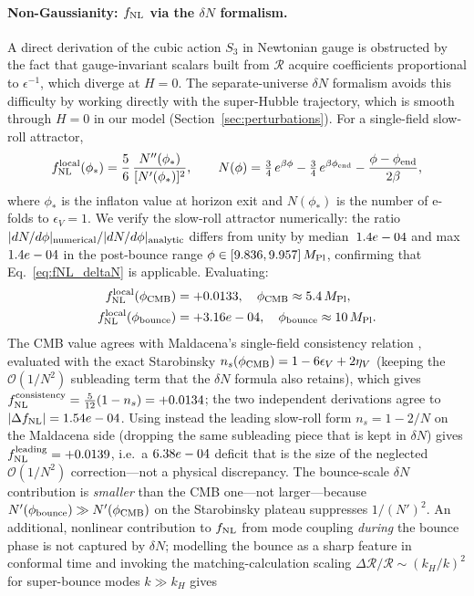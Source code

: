 \documentclass[11pt,a4paper]{article}
\begin{document}
\paragraph{Non-Gaussianity: $f_{\rm NL}$ via the $\delta N$ formalism.}
A direct derivation of the cubic action $S_3$ in Newtonian gauge is obstructed by the fact that gauge-invariant scalars built from $\mathcal{R}$ acquire coefficients proportional to $\epsilon^{-1}$, which diverge at $H = 0$. The separate-universe $\delta N$ formalism \cite{Wands2000,SugiyamaKomatsuFutamase2013} avoids this difficulty by working directly with the super-Hubble trajectory, which is smooth through $H = 0$ in our model (Section~\ref{sec:perturbations}). For a single-field slow-roll attractor,
\begin{equation}
\label{eq:fNL_deltaN}
f_{\rm NL}^{\rm local}(\phi_*) = \frac{5}{6}\,\frac{N''(\phi_*)}{[N'(\phi_*)]^2},
\qquad
N(\phi) = \tfrac{3}{4}\,e^{\beta\phi} - \tfrac{3}{4}\,e^{\beta\phi_{\rm end}} - \frac{\phi - \phi_{\rm end}}{2\beta},
\end{equation}
where $\phi_*$ is the inflaton value at horizon exit and $N(\phi_*)$ is the number of e-folds to $\epsilon_V = 1$. We verify the slow-roll attractor numerically: the ratio $|dN/d\phi|_{\rm numerical} / |dN/d\phi|_{\rm analytic}$ differs from unity by median~$1.4e-04$ and max~$1.4e-04$ in the post-bounce range $\phi \in [9.836, 9.957]\,M_{\rm Pl}$, confirming that Eq.~\eqref{eq:fNL_deltaN} is applicable. Evaluating:
\begin{align}
f_{\rm NL}^{\rm local}(\phi_{\rm CMB}) &= +0.0133, \quad \phi_{\rm CMB} \approx 5.4\,M_{\rm Pl}, \\
f_{\rm NL}^{\rm local}(\phi_{\rm bounce}) &= +3.16e-04, \quad \phi_{\rm bounce} \approx 10\,M_{\rm Pl}.
\end{align}
The CMB value agrees with Maldacena's single-field consistency relation \cite{Maldacena2003}, evaluated with the exact Starobinsky $n_s(\phi_{\rm CMB}) = 1 - 6\epsilon_V + 2\eta_V$ (keeping the $\mathcal{O}(1/N^2)$ subleading term that the $\delta N$ formula also retains), which gives $f_{\rm NL}^{\rm consistency} = \tfrac{5}{12}(1-n_s) = +0.0134$; the two independent derivations agree to $|\Delta f_{\rm NL}| = 1.54e-04$.  Using instead the leading slow-roll form $n_s = 1 - 2/N$ on the Maldacena side (dropping the same subleading piece that is kept in $\delta N$) gives $f_{\rm NL}^{\rm leading} = +0.0139$, i.e.\ a $6.38e-04$ deficit that is the size of the neglected $\mathcal{O}(1/N^2)$ correction---not a physical discrepancy. The bounce-scale $\delta N$ contribution is \emph{smaller} than the CMB one---not larger---because $N'(\phi_{\rm bounce}) \gg N'(\phi_{\rm CMB})$ on the Starobinsky plateau suppresses $1/(N')^2$. An additional, nonlinear contribution to $f_{\rm NL}$ from mode coupling \emph{during} the bounce phase is not captured by $\delta N$; modelling the bounce as a sharp feature in conformal time \cite{Deruelle1995} and invoking the matching-calculation scaling $\Delta\mathcal{R}/\mathcal{R} \sim (k_H/k)^2$ for super-bounce modes $k \gg k_H$ gives
\end{document}
